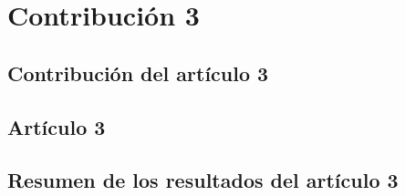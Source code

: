 \chapter{Contribución 3}
\label{cha:contribucion-3}

\section{Contribución del artículo 3}
\label{sec:contribucion-articulo-3}

\section{Artículo 3}
\label{sec:articulo-3}

\section{Resumen de los resultados del artículo 3}
\label{sec:resumen-resultados-articulo-3}